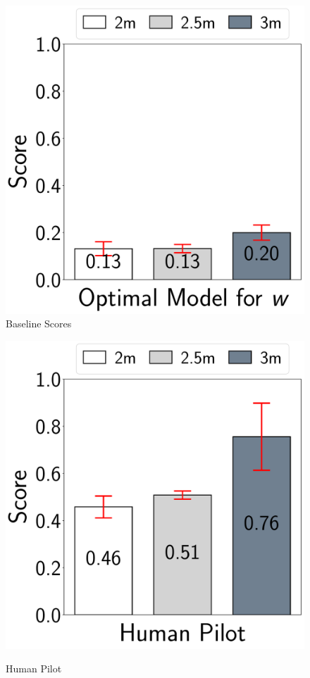 \begin{figure}
\centering
\begin{minipage}{0.45\linewidth}
\centering
\includegraphics[width=1.0\linewidth]{chapter6/FIGS/fig-avoidance-best.pdf}\\
\caption{Baseline Scores}
\label{fig:avoid-best}
\end{minipage}
\begin{minipage}{0.45\linewidth}
\centering
\includegraphics[width=1.0\linewidth]{chapter6/FIGS/fig-avoidance-human.pdf}\\
\caption{Human Pilot}
\label{fig:avoid-human}
\end{minipage}
\end{figure}


